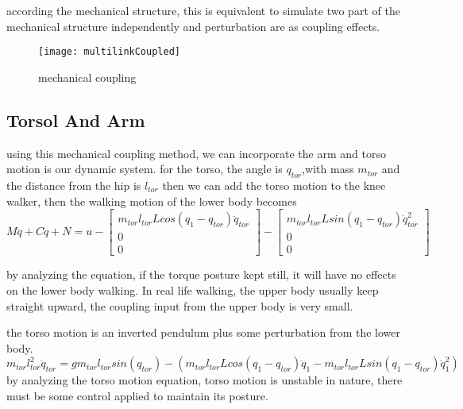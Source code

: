 according the mechanical structure, this is equivalent to simulate two part of the mechanical structure independently and perturbation are as coupling effects.
\begin{figure}[!htbp]
  \begin{center}
      \texttt{[image: multilinkCoupled]}
    \caption{mechanical coupling}
    \label{fig:mechcouple}
\end{center}
\end{figure}








\subsection*{Torsol And Arm}
using this mechanical coupling method, we can incorporate the arm and torso motion is our dynamic system.
for the torso, the angle is $q_{tor}$,with mass $m_{tor}$ and the distance from the hip is $l_{tor}$
then we can add the torso motion to the knee walker, then the walking motion of the lower body becomes
\begin{equation}
\label{eq:walkcouplewithtorso}
M\ddot{q}+C\dot{q}+N=u-\left[\begin{array}{c}
m_{tor}l_{tor}Lcos(q_{1}-q_{tor})\ddot{q}_{tor}\\
0\\
0\end{array}\right]-\left[\begin{array}{c}
m_{tor}l_{tor}Lsin(q_{1}-q_{tor})\dot{q}_{tor}^{2}\\
0\\
0\end{array}\right]
\end{equation}

by analyzing the equation, if the torque posture kept still, it will have no effects on the lower body walking.
In real life walking, the upper body usually keep straight upward, the coupling input from the upper body is very small.



the torso motion is an inverted pendulum plus some perturbation from the lower body.
\[
m_{tor}l_{tor}^{2}\ddot{q}_{tor}=gm_{tor}l_{tor}sin(q_{tor})-(m_{tor}l_{tor}Lcos(q_{1}-q_{tor})\ddot{q}_{1}-m_{tor}l_{tor}Lsin(q_{1}-q_{tor})\dot{q}_{1}^{2})
\]
by analyzing the torso motion equation, torso motion is unstable in nature, there must be some control applied to maintain its posture.

